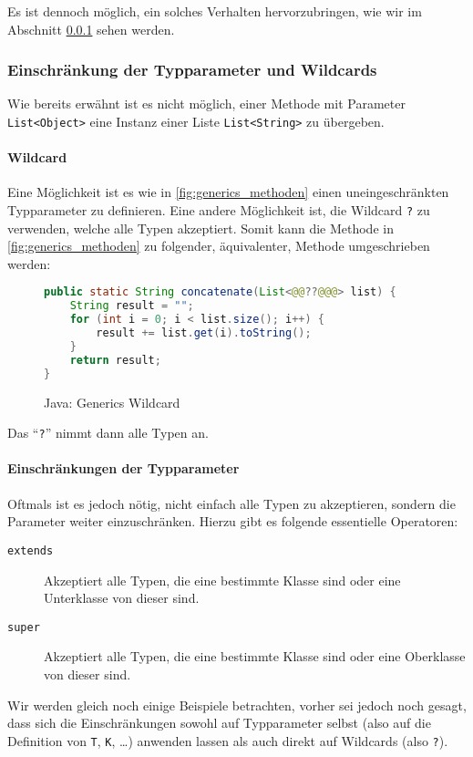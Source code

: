 		Es ist dennoch möglich, ein solches Verhalten hervorzubringen, wie wir im Abschnitt \ref{sec:generics_restriction} sehen werden.
	
	\subsubsection{Einschränkung der Typparameter und Wildcards}
		\label{sec:generics_restriction}
	
		Wie bereits erwähnt ist es nicht möglich, einer Methode mit Parameter \texttt{List<Object>} eine Instanz einer Liste \texttt{List<String>} zu übergeben.
		
		\paragraph{Wildcard}
			Eine Möglichkeit ist es wie in \ref{fig:generics_methoden} einen uneingeschränkten Typparameter zu definieren. Eine andere Möglichkeit ist, die Wildcard \texttt{?} zu verwenden, welche alle Typen akzeptiert. Somit kann die Methode in \ref{fig:generics_methoden} zu folgender, äquivalenter, Methode umgeschrieben werden:
			\begin{figure}[H]
				\centering
				\begin{lstlisting}[language = Java, style = base]
public static String concatenate(List<@@??@@@> list) {
	String result = "";
	for (int i = 0; i < list.size(); i++) {
		result += list.get(i).toString();
	}
	return result;
}
				\end{lstlisting}
				\caption{Java: Generics Wildcard}
			\end{figure}
			Das \enquote{\texttt{?}} nimmt dann alle Typen an.
		
		\paragraph{Einschränkungen der Typparameter}
			Oftmals ist es jedoch nötig, nicht einfach alle Typen zu akzeptieren, sondern die Parameter weiter einzuschränken. Hierzu gibt es folgende essentielle Operatoren:
			\begin{description}
				\item[\texttt{extends}] Akzeptiert alle Typen, die eine bestimmte Klasse sind oder eine Unterklasse von dieser sind.
				\item[\texttt{super}] Akzeptiert alle Typen, die eine bestimmte Klasse sind oder eine Oberklasse von dieser sind.
			\end{description}
			Wir werden gleich noch einige Beispiele betrachten, vorher sei jedoch noch gesagt, dass sich die Einschränkungen sowohl auf Typparameter selbst (also auf die Definition von \texttt{T}, \texttt{K}, \dots) anwenden lassen als auch direkt auf Wildcards (also \texttt{?}).
			
